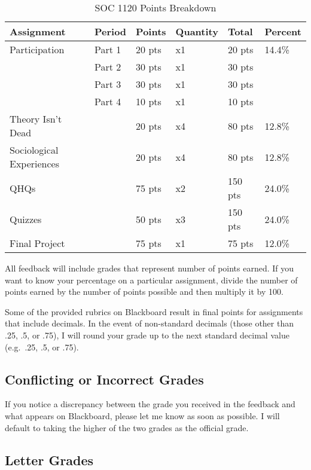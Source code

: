 \documentclass[
]{book}
\begin{document}
\begin{table}

\caption{\label{tab:unnamed-chunk-10}SOC 1120 Points Breakdown}
\centering
\begin{tabular}[t]{llllll}
\toprule
Assignment & Period & Points & Quantity & Total & Percent\\
\midrule
Participation & Part 1 & 20 pts & x1 & 20 pts & 14.4\%\\
 & Part 2 & 30 pts & x1 & 30 pts & \\
 & Part 3 & 30 pts & x1 & 30 pts & \\
 & Part 4 & 10 pts & x1 & 10 pts & \\
Theory Isn't Dead &  & 20 pts & x4 & 80 pts & 12.8\%\\
\addlinespace
Sociological Experiences &  & 20 pts & x4 & 80 pts & 12.8\%\\
QHQs &  & 75 pts & x2 & 150 pts & 24.0\%\\
Quizzes &  & 50 pts & x3 & 150 pts & 24.0\%\\
Final Project &  & 75 pts & x1 & 75 pts & 12.0\%\\
\bottomrule
\end{tabular}
\end{table}

All feedback will include grades that represent number of points earned. If you want to know your percentage on a particular assignment, divide the number of points earned by the number of points possible and then multiply it by 100.

Some of the provided rubrics on Blackboard result in final points for assignments that include decimals. In the event of non-standard decimals (those other than .25, .5, or .75), I will round your grade up to the next standard decimal value (e.g.~.25, .5, or .75).

\hypertarget{conflicting-or-incorrect-grades}{%
\subsection{Conflicting or Incorrect Grades}\label{conflicting-or-incorrect-grades}}

If you notice a discrepancy between the grade you received in the feedback and what appears on Blackboard, please let me know as soon as possible. I will default to taking the higher of the two grades as the official grade.

\hypertarget{letter-grades}{%
\subsection{Letter Grades}\label{letter-grades}}
\end{document}
